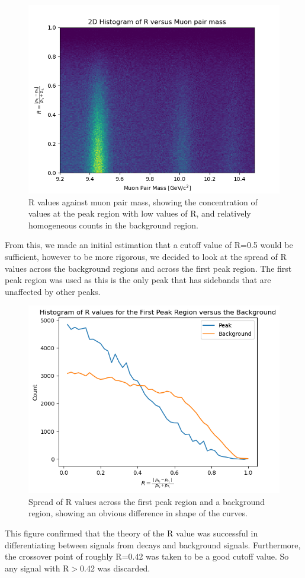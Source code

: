 \begin{figure}[H]
\centering
\includegraphics[width=0.7\columnwidth]{figures/xmass_sub_mom_tran_1_2_2d_hist.png}
\caption{R values against muon pair mass, showing the concentration of values at the peak region with low values of R, and relatively homogeneous counts in the background region.}
\label{fig:2d_hists_ex}
\end{figure}

From this, we made an initial estimation that a cutoff value of R=0.5 would be sufficient, however to be more rigorous, we decided to look at the spread of R values across the background regions and across the first peak region. The first peak region was used as this is the only peak that has sidebands that are unaffected by other peaks. 

\begin{figure}[H]
\centering
\includegraphics[width=0.6\columnwidth]{figures/r_val_graph.png}
\caption{Spread of R values across the first peak region and a background region, showing an obvious difference in shape of the curves.}
\label{fig:2d_hists_ex}
\end{figure}

This figure confirmed that the theory of the R value was successful in differentiating between signals from decays and background signals. Furthermore, the crossover point of roughly R=0.42 was taken to be a good cutoff value. So any signal with R$>$0.42 was discarded.\\

